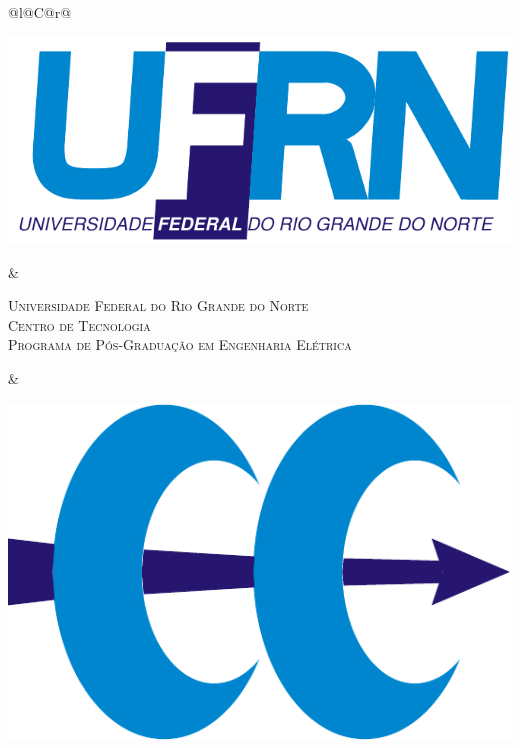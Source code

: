 %
%

\begin{titlepage}

\begin{center}

\small

\begin{tabularx}{\linewidth}{@{}l@{}C@{}r@{}}
\parbox[c]{3cm}{\includegraphics[width=\linewidth]{tex/00-estrutural/figuras/UFRN}} &
\begin{center}
\textsf{\textsc{Universidade Federal do Rio Grande do Norte\\
Centro de Tecnologia\\
Programa de Pós-Graduação em Engenharia Elétrica}}
\end{center} &
\parbox[c]{2cm}{\includegraphics[width=\linewidth]{tex/00-estrutural/figuras/PPgEE}}
\end{tabularx}


\end{center}
\end{titlepage}
